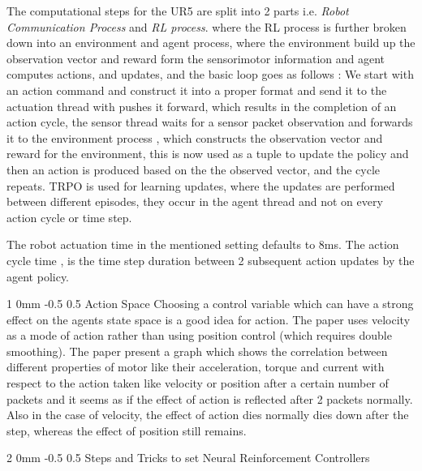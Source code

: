 \documentclass[twocolumn,11pt]{article}
\makeatletter
\renewcommand{\section}{\@startsection
{section}%
{2}%
{0mm}%
{-0.5\baselineskip}%
{0.5\baselineskip}%
{\bfseries\color{blue}}} %
\renewcommand{\subsection}{\@startsection
{subsection}%
{1}%
{0mm}%
{-0.5\baselineskip}%
{0.5\baselineskip}%
{\bfseries\color{blue}}} %
\makeatother
\begin{document}
The computational steps for the UR5 are split into 2 parts i.e. \textit{Robot Communication Process} and  \textit{RL process}.  where the RL process is further broken  down into an environment and agent process, where the environment build up the observation vector and reward form the  sensorimotor information and agent computes actions, and  updates, and the basic loop goes as follows : We start with an action command and construct  it into a proper format and send it to the actuation thread with pushes it forward, which results in the completion of an action cycle, the sensor thread waits for a sensor packet observation and forwards it to the environment process , which constructs the observation vector and reward for the  environment, this is now used as a tuple to update the policy and then an action is produced based on the the observed vector, and the cycle repeats.
TRPO is used for learning updates, where the updates are performed between different episodes, they occur in the  agent thread and not on every action cycle or time step.

The robot actuation time in the mentioned setting defaults to 8ms. The action cycle time , is the time step duration between 2 subsequent action updates  by the agent policy.

\subsection{Action Space}
Choosing a control variable which can have a strong effect on the agents state space is a good idea for action.
The paper uses velocity as a mode of action rather than using position control (which requires double smoothing).  The paper present a graph which shows the correlation between different properties of motor like their acceleration, torque and current with respect to the  action taken like velocity 
or position after a certain number of packets and it seems as if the effect of action is reflected after 2 packets
normally. Also in the case of velocity,  the effect of action dies normally dies down after the  step, whereas the  effect of position still remains.

\section{Steps and Tricks  to set Neural Reinforcement Controllers}
\end{document}
